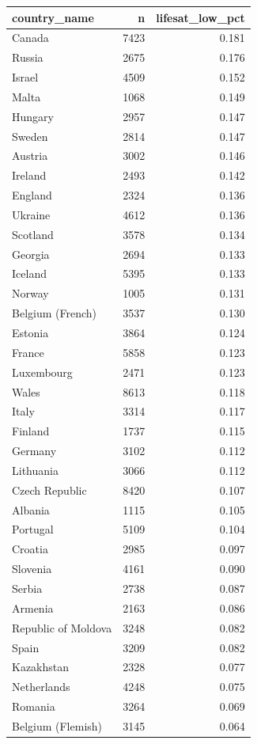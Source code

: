 \documentclass[
]{article}
\begin{document}
\begin{longtable}[]{@{}lrr@{}}
\toprule\noalign{}
country\_name & n & lifesat\_low\_pct \\
\midrule\noalign{}
\endhead
\bottomrule\noalign{}
\endlastfoot
Canada & 7423 & 0.181 \\
Russia & 2675 & 0.176 \\
Israel & 4509 & 0.152 \\
Malta & 1068 & 0.149 \\
Hungary & 2957 & 0.147 \\
Sweden & 2814 & 0.147 \\
Austria & 3002 & 0.146 \\
Ireland & 2493 & 0.142 \\
England & 2324 & 0.136 \\
Ukraine & 4612 & 0.136 \\
Scotland & 3578 & 0.134 \\
Georgia & 2694 & 0.133 \\
Iceland & 5395 & 0.133 \\
Norway & 1005 & 0.131 \\
Belgium (French) & 3537 & 0.130 \\
Estonia & 3864 & 0.124 \\
France & 5858 & 0.123 \\
Luxembourg & 2471 & 0.123 \\
Wales & 8613 & 0.118 \\
Italy & 3314 & 0.117 \\
Finland & 1737 & 0.115 \\
Germany & 3102 & 0.112 \\
Lithuania & 3066 & 0.112 \\
Czech Republic & 8420 & 0.107 \\
Albania & 1115 & 0.105 \\
Portugal & 5109 & 0.104 \\
Croatia & 2985 & 0.097 \\
Slovenia & 4161 & 0.090 \\
Serbia & 2738 & 0.087 \\
Armenia & 2163 & 0.086 \\
Republic of Moldova & 3248 & 0.082 \\
Spain & 3209 & 0.082 \\
Kazakhstan & 2328 & 0.077 \\
Netherlands & 4248 & 0.075 \\
Romania & 3264 & 0.069 \\
Belgium (Flemish) & 3145 & 0.064 \\
\end{longtable}
\end{document}

